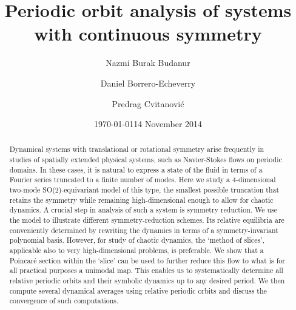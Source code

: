 \documentclass[aip,cha,
reprint,
secnumarabic,
nofootinbib, tightenlines,
nobibnotes, showkeys, showpacs,
superscriptaddress,
]{revtex4-1}
\begin{document}
\title[Periodic orbit analysis of systems with continuous symmetry]
{Periodic orbit analysis of systems with continuous symmetry}

\author{Nazmi Burak Budanur}
\author{Daniel Borrero-Echeverry}
\author{Predrag Cvitanovi\'{c}}
    \ifdraft
\date{\today}
    \else
\date{14 November 2014}
   \fi

\begin{abstract}
Dynamical systems with translational or rotational symmetry arise
frequently in studies of spatially extended physical systems, such as
Navier-Stokes flows on periodic domains. In these cases, it is natural to
express a state of the fluid in terms of a Fourier series truncated to a
finite number of modes. Here we study a 4-dimensional two-mode
SO(2)-equivariant model of this type, the smallest possible truncation
that retains the symmetry while remaining high-dimensional enough to
allow for chaotic dynamics. A crucial step in analysis of such a system
is symmetry reduction. We use the model to illustrate different
symmetry-reduction schemes. Its relative equilibria are conveniently
determined by rewriting the dynamics in terms of a symmetry-invariant
polynomial basis. However, for study of chaotic dynamics, the `method of
slices', applicable also to very high-dimensional problems, is
preferable. We show that a Poincar\'e section within the `slice' can be
used to further reduce this flow to what is for all practical purposes a
unimodal map. This enables us to systematically determine all relative
periodic orbits and their symbolic dynamics up to any desired period. We
then compute several dynamical averages using relative periodic orbits
and discuss the convergence of such computations.
\end{abstract}

\maketitle
\end{document}

